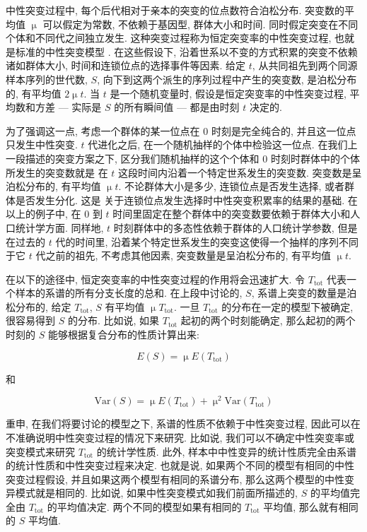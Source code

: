 \documentclass[12pt]{article}
\begin{document}
中性突变过程中, 每个后代相对于亲本的突变的位点数符合泊松分布. 突变数的平均值 $\upmu$ 可以假定为常数,
不依赖于基因型, 群体大小和时间. 同时假定突变在不同个体和不同代之间独立发生.
这种突变过程称为恒定突变率的中性突变过程, 也就是标准的中性突变模型 \parencite{kimura1983, watterson1975}.
在这些假设下, 沿着世系以不变的方式积累的突变不依赖诸如群体大小, 时间和连锁位点的选择事件等因素.
给定 $t$, 从共同祖先到两个同源样本序列的世代数, $S$, 向下到这两个派生的序列过程中产生的突变数, 是泊松分布的, 有平均值 $2 \upmu t$.
当 $t$ 是一个随机变量时, 假设是恒定突变率的中性突变过程, 平均数和方差 --- 实际是 $S$ 的所有瞬间值 ---
都是由时刻 $t$ 决定的.

为了强调这一点, 考虑一个群体的某一位点在 0 时刻是完全纯合的, 并且这一位点只发生中性突变.
$t$ 代进化之后, 在一个随机抽样的个体中检验这一位点.
在我们上一段描述的突变方案之下, 区分我们随机抽样的这个个体和 0 时刻时群体中的个体所发生的突变数就是
在 $t$ 这段时间内沿着一个特定世系发生的突变数.
突变数是呈泊松分布的, 有平均值 $\upmu t$. 不论群体大小是多少, 连锁位点是否发生选择, 或者群体是否发生分化. 这是
\textcite{birky1988} 关于连锁位点发生选择时中性突变积累率的结果的基础.
在以上的例子中, 在 0 到 $t$ 时间里固定在整个群体中的突变数要依赖于群体大小和人口统计学方面.
同样地, $t$ 时刻群体中的多态性依赖于群体的人口统计学参数, 但是在过去的 $t$ 代的时间里,
沿着某个特定世系发生的突变这使得一个抽样的序列不同于它 $t$ 代之前的祖先, 不考虑其他因素,
突变数量是呈泊松分布的, 有平均值 $\upmu t$.

在以下的途径中, 恒定突变率的中性突变过程的作用将会迅速扩大.
令 $T_{\text{tot}}$ 代表一个样本的系谱的所有分支长度的总和.
在上段中讨论的, $S$, 系谱上突变的数量是泊松分布的, 给定 $T_{\text{tot}}$, $S$ 有平均值 $\upmu T_{\text{tot}}$.
一旦 $T_{\text{tot}}$ 的分布在一定的模型下被确定, 很容易得到 $S$ 的分布.
比如说, 如果 $T_{\text{tot}}$ 起初的两个时刻能确定, 那么起初的两个时刻的 $S$ 能够根据复合分布的性质计算出来:

\begin{equation} \label{eq:1}
    E(S) = \upmu E(T_{\text{tot}})
\end{equation}

和

\begin{equation} \label{eq:2}
    \text{Var}(S) = \upmu E(T_{\text{tot}}) + \upmu ^{2}\text{Var}(T_{\text{tot}})
\end{equation}

重申, 在我们将要讨论的模型之下, 系谱的性质不依赖于中性突变过程, 因此可以在不准确说明中性突变过程的情况下来研究.
比如说, 我们可以不确定中性突变率或突变模式来研究 $T_{\text{tot}}$ 的统计学性质.
此外, 样本中中性变异的统计性质完全由系谱的统计性质和中性突变过程来决定.
也就是说, 如果两个不同的模型有相同的中性突变过程假设, 并且如果这两个模型有相同的系谱分布,
那么这两个模型的中性变异模式就是相同的.
比如说, 如果中性突变模式如我们前面所描述的, $S$ 的平均值完全由 $T_{\text{tot}}$ 的平均值决定.
两个不同的模型如果有相同的 $T_{\text{tot}}$ 平均值, 那么就有相同的 $S$ 平均值.
\end{document}
